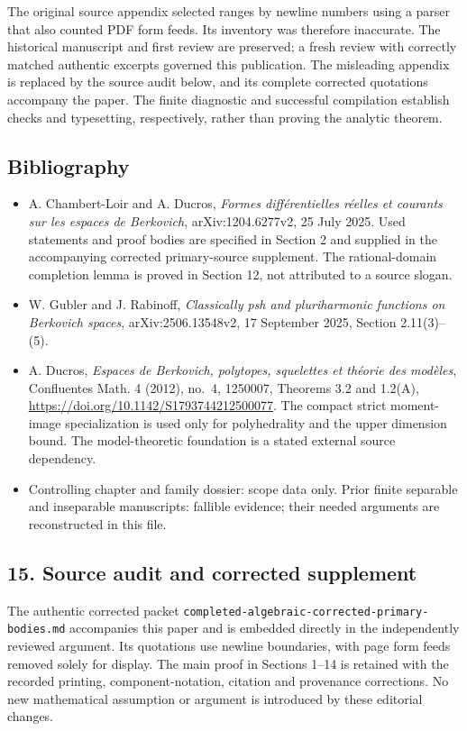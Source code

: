 \documentclass[
  11pt,
]{article}
\providecommand{\tightlist}{%
  \setlength{\itemsep}{0pt}\setlength{\parskip}{0pt}}
\begin{document}
The original source appendix selected ranges by newline numbers using
a parser that also counted PDF form feeds. Its inventory was therefore
inaccurate. The historical manuscript and first review are preserved;
a fresh review with correctly matched authentic excerpts governed this
publication. The misleading appendix is replaced by the source audit
below, and its complete corrected quotations accompany the paper.
The finite diagnostic and successful compilation establish checks and
typesetting, respectively, rather than proving the analytic theorem.

\subsection{Bibliography}\label{bibliography}

\begin{itemize}
\tightlist
\item
  A. Chambert-Loir and A. Ducros, \emph{Formes différentielles réelles
  et courants sur les espaces de Berkovich}, arXiv:1204.6277v2, 25 July
  2025. Used statements and proof bodies are specified in Section 2 and
  supplied in the accompanying corrected primary-source supplement. The rational-domain completion lemma is proved in
  Section 12, not attributed to a source slogan.
\item
  W. Gubler and J. Rabinoff, \emph{Classically psh and pluriharmonic
  functions on Berkovich spaces}, arXiv:2506.13548v2, 17 September 2025,
  Section 2.11(3)--(5).
\item
  A. Ducros, \emph{Espaces de Berkovich, polytopes, squelettes et
  th\'eorie des mod\`eles}, Confluentes Math. 4 (2012), no.~4,
  1250007, Theorems 3.2 and 1.2(A),
  \url{https://doi.org/10.1142/S1793744212500077}.
  The compact strict moment-image specialization is used only for
  polyhedrality and the upper dimension bound. The model-theoretic
  foundation is a stated external source dependency.
\item
  Controlling chapter and family dossier: scope data only. Prior finite
  separable and inseparable manuscripts: fallible evidence; their needed
  arguments are reconstructed in this file.
\end{itemize}

\subsection{15. Source audit and corrected supplement}

The authentic corrected packet
\texttt{completed-algebraic-corrected-primary-bodies.md} accompanies
this paper and is embedded directly in the independently reviewed
argument. Its quotations use newline boundaries, with page form feeds
removed solely for display. The main proof in Sections 1--14 is retained
with the recorded printing, component-notation, citation and provenance
corrections. No new mathematical assumption or argument is introduced
by these editorial changes.
\end{document}
